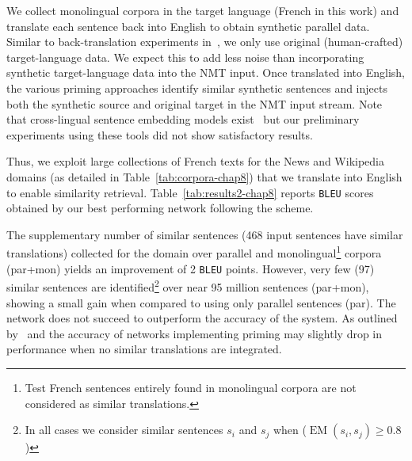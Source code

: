 We collect monolingual corpora in the target language (French in this work) and translate each sentence back into English to obtain synthetic parallel data. Similar to back-translation experiments in~\citet{Sennrich16improving}, we only use original (human-crafted) target-language data. We expect this to add less noise than incorporating synthetic target-language data into the NMT input.
Once translated into English, the various priming approaches identify similar synthetic sentences and injects both the synthetic source and original target in the NMT input stream.
%
Note that cross-lingual sentence embedding models exist~\cite{sabet2019robust,schwenk17learning,Conneau19crosslingual} but our preliminary experiments using these tools did not show satisfactory results.

Thus, we exploit large collections of French texts for the News and Wikipedia domains (as detailed in Table~\ref{tab:corpora-chap8}) that we translate into English to enable similarity retrieval. 
%
Table~\ref{tab:results2-chap8} reports \texttt{BLEU} scores obtained by our best performing network  following the  scheme.


The supplementary number of similar sentences (468 input sentences have similar translations) collected for the  domain over parallel and monolingual\footnote{Test French sentences entirely found in monolingual  corpora are not considered as similar translations.} corpora (par+mon) yields an improvement of 2 \texttt{BLEU} points.
However, very few (97) similar sentences are identified\footnote{In all cases we consider similar sentences $s_i$ and $s_j$ when ($\operatorname{EM}(s_i,s_j) \ge 0.8$)} over near 95 million sentences (par+mon), showing a small gain when compared to using only parallel sentences (par). The network does not succeed to outperform the accuracy of the  system. 
As outlined by~\citet{bulte19neural} and \citet{xu20boosting} the accuracy of networks implementing priming may slightly drop in performance when no similar translations are integrated. 

